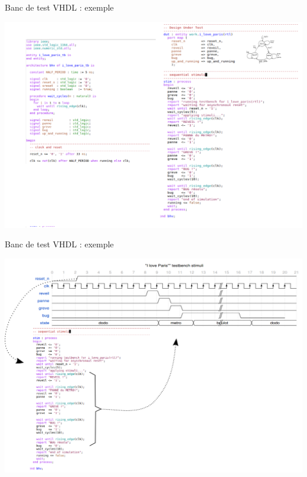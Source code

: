 \documentclass[xcolor=table]{beamer} %
\begin{document}
\begin{frame}{Banc de test VHDL : exemple}
  \begin{center}
  \begin{minipage}[t]{19cm}
   \includegraphics[scale=0.12]{./figures/tb_000.png}
  \end{minipage}
  \end{center}
\end{frame}

\begin{frame}{Banc de test VHDL : exemple}
  \begin{center}
  \begin{minipage}[t]{19cm}
   \includegraphics[scale=0.3]{./figures/wave_drom.png}
  \end{minipage}
  \end{center}
\end{frame}
\end{document}
